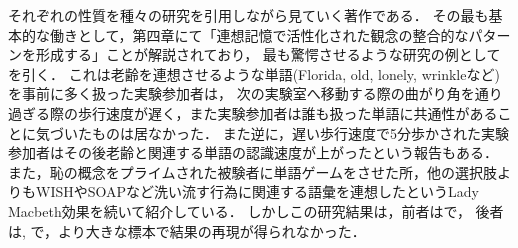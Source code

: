 \documentclass[uplatex, dvipdfmx]{jsarticle}
\begin{document}
\begin{enumerate}[(a)]
    それぞれの性質を種々の研究を引用しながら見ていく著作である．
    その最も基本的な働きとして，第四章にて「連想記憶で活性化された観念の整合的なパターンを形成する」ことが解説されており，
    最も驚愕させるような研究の例として\cite{JohnBargh-Priming}を引く．
    これは老齢を連想させるような単語(Florida, old, lonely, wrinkleなど)を事前に多く扱った実験参加者は，
    次の実験室へ移動する際の曲がり角を通り過ぎる際の歩行速度が遅く，また実験参加者は誰も扱った単語に共通性があることに気づいたものは居なかった．
    また逆に，遅い歩行速度で5分歩かされた実験参加者はその後老齢と関連する単語の認識速度が上がったという報告もある\cite{Mussweiler06-Priming}．
    また，恥の概念をプライムされた被験者に単語ゲームをさせた所，他の選択肢よりもWISHやSOAPなど洗い流す行為に関連する語彙を連想したというLady Macbeth効果\cite{06-LadyMacbeth}を続いて紹介している．
    しかしこの研究結果は，前者は\cite{12-ANTIBehavioralPriming}で，
    後者は\cite{11-AntiLadyMacbeth}, \cite{14-AntiLadyMacbeth}で，より大きな標本で結果の再現が得られなかった．
\end{enumerate}


\end{document}
